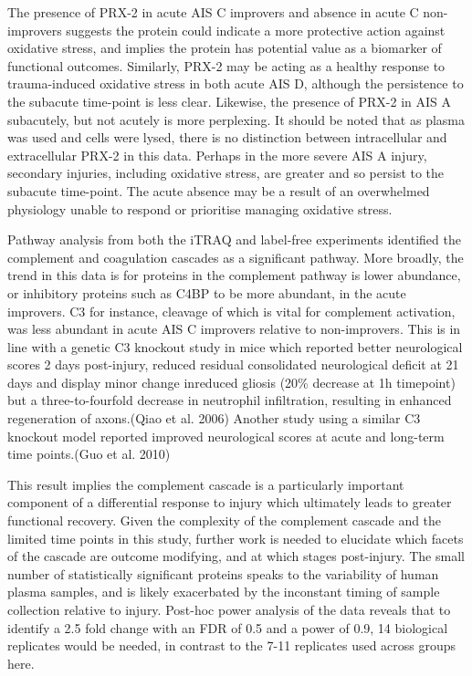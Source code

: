 \documentclass[9pt,lineno]{elife}
\begin{document}
\begin{landscape}
\begin{landscape}
The presence of PRX-2 in acute AIS C improvers and absence in acute C non-improvers suggests the protein could indicate a more protective action against oxidative stress, and implies the protein has potential value as a biomarker of functional outcomes.
Similarly, PRX-2 may be acting as a healthy response to trauma-induced oxidative stress in both acute AIS D, although the persistence to the subacute time-point is less clear.
Likewise, the presence of PRX-2 in AIS A subacutely, but not acutely is more perplexing.
It should be noted that as plasma was used and cells were lysed, there is no distinction between intracellular and extracellular PRX-2 in this data.
Perhaps in the more severe AIS A injury, secondary injuries, including oxidative stress, are greater and so persist to the subacute time-point.
The acute absence may be a result of an overwhelmed physiology unable to respond or prioritise managing oxidative stress.

Pathway analysis from both the iTRAQ and label-free experiments identified the complement and coagulation cascades as a significant pathway.
More broadly, the trend in this data is for proteins in the complement pathway is lower abundance, or inhibitory proteins such as C4BP to be more abundant, in the acute improvers.
C3 for instance, cleavage of which is vital for complement activation, was less abundant in acute AIS C improvers relative to non-improvers.
This is in line with a genetic C3 knockout study in mice which reported better neurological scores 2 days post-injury, reduced residual consolidated neurological deficit at 21 days and display minor change inreduced gliosis (20\% decrease at 1h timepoint) but a three-to-fourfold decrease in neutrophil infiltration, resulting in enhanced regeneration of axons.(Qiao et al. 2006) Another study using a similar C3 knockout model reported improved neurological scores at acute and long-term time points.(Guo et al. 2010)

This result implies the complement cascade is a particularly important component of a differential response to injury which ultimately leads to greater functional recovery.
Given the complexity of the complement cascade and the limited time points in this study, further work is needed to elucidate which facets of the cascade are outcome modifying, and at which stages post-injury.
The small number of statistically significant proteins speaks to the variability of human plasma samples, and is likely exacerbated by the inconstant timing of sample collection relative to injury.
Post-hoc power analysis of the data reveals that to identify a 2.5 fold change with an FDR of 0.5 and a power of 0.9, 14 biological replicates would be needed, in contrast to the 7-11 replicates used across groups here.


\end{landscape}
\end{landscape}
\end{document}
